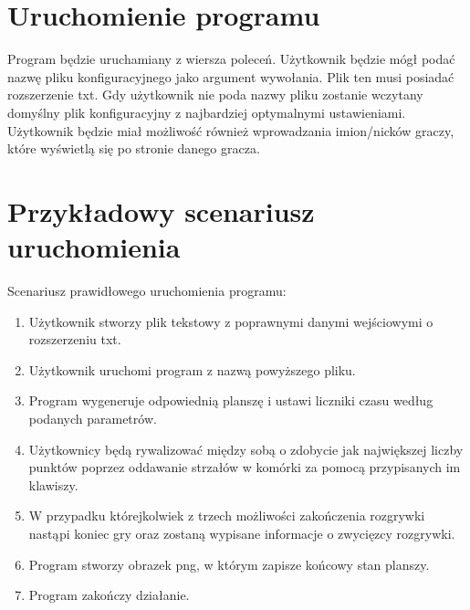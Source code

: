\documentclass{article}
\begin{document}
\section{Uruchomienie programu}
{\fontsize{14}{14}\selectfont 
Program będzie uruchamiany z wiersza poleceń. Użytkownik będzie mógł podać nazwę pliku konfiguracyjnego jako argument wywołania. Plik ten musi posiadać rozszerzenie txt. Gdy użytkownik nie poda nazwy pliku zostanie wczytany domyślny plik konfiguracyjny z najbardziej optymalnymi ustawieniami. Użytkownik będzie miał możliwość również wprowadzania imion/nicków graczy, które wyświetlą się po stronie danego gracza.
}

\section{Przykładowy scenariusz uruchomienia}
{\fontsize{14}{14}\selectfont 
Scenariusz prawidłowego uruchomienia programu:
\begin{enumerate}
\item Użytkownik stworzy plik tekstowy z poprawnymi danymi wejściowymi o rozszerzeniu txt.
\item Użytkownik uruchomi program z nazwą powyższego pliku.
\item Program wygeneruje odpowiednią planszę i ustawi liczniki czasu według podanych parametrów.
\item Użytkownicy będą rywalizować między sobą o zdobycie jak największej liczby punktów poprzez oddawanie strzałów w komórki za pomocą przypisanych im klawiszy.
\item W przypadku którejkolwiek z trzech możliwości zakończenia rozgrywki nastąpi koniec gry oraz zostaną wypisane informacje o zwycięzcy rozgrywki.
\item Program stworzy obrazek png, w którym zapisze końcowy stan planszy.
\item Program zakończy działanie.
\end{enumerate}
}
\newpage
{}
\end{document}
